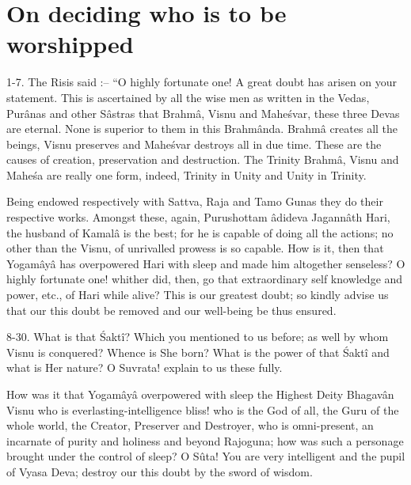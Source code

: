 \chapter{On deciding who is to be worshipped}

1-7. The Risis said :-- ``O highly fortunate one! A great doubt has arisen on your statement. This is ascertained by all the wise men as written in the Vedas, Pur\^anas and other S\^astras that Brahm\^a, Visnu and Mahe\'svar, these three Devas are eternal. None is superior to them in this Brahm\^anda. Brahm\^a creates all the beings, Visnu preserves and Mahe\'svar destroys all in due time. These are the causes of creation, preservation and destruction. The Trinity Brahm\^a, Visnu and Mahe\'sa are really one form, indeed, Trinity in Unity and Unity in Trinity.

Being endowed respectively with Sattva, Raja and Tamo Gunas they do their respective works. Amongst these, again, Purushottam \^adideva Jagann\^ath Hari, the husband of Kamal\^a is the best; for he is capable of doing all the actions; no other than the Visnu, of unrivalled prowess is so capable. How is it, then that Yogam\^ay\^a has overpowered Hari with sleep and made him altogether senseless? O highly fortunate one! whither did, then, go that extraordinary self knowledge and power, etc., of Hari while alive? This is our greatest doubt; so kindly advise us that our this doubt be removed and our well-being be thus ensured.

8-30. What is that \'Sakt\^i? Which you mentioned to us before; as well by whom Visnu is conquered? Whence is She born? What is the power of that \'Sakt\^i and what is Her nature? O Suvrata! explain to us these fully.

How was it that Yogam\^ay\^a overpowered with sleep the Highest Deity Bhagav\^an Visnu who is everlasting-intelligence bliss! who is the God of all, the Guru of the whole world, the Creator, Preserver and Destroyer, who is omni-present, an incarnate of purity and holiness and beyond Rajoguna; how was such a personage brought under the control of sleep? O S\^uta! You are very intelligent and the pupil of Vyasa Deva; destroy our this doubt by the sword of wisdom.

